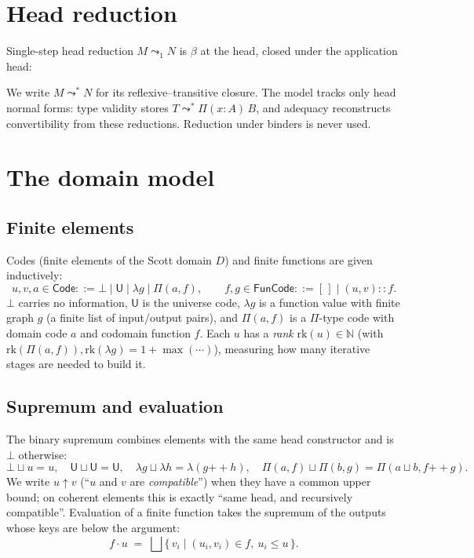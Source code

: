 \documentclass[11pt]{article}
\newcommand{\Pitype}[2]{\Pi(#1)\,#2}
\newcommand{\Lamterm}[2]{\lambda(#1)\,#2}
\newcommand{\App}[2]{#1\;#2}
\newcommand{\substone}[2]{#1[#2]}
\newcommand{\U}{\mathsf{U}}
\newcommand{\Red}{\mathrel{\leadsto^{*}}}
\newcommand{\Bot}{\bot}
\newcommand{\PiC}[2]{\Pi(#1,#2)}        %
\newcommand{\FunEl}[1]{\lambda #1}      %
\newcommand{\ev}[2]{#1\!\cdot\!#2}      %
\newcommand{\app}{\mathbin{+\!\!+}}     %
\newcommand{\comp}{\mathbin{\uparrow}}  %
\newcommand{\Code}{\mathsf{Code}}
\newcommand{\FunCode}{\mathsf{FunCode}}
\newcommand{\rk}{\mathrm{rk}}
\newcommand{\Nat}{\mathbb{N}}
\theoremstyle{plain}
\theoremstyle{definition}
\begin{document}
\section{Head reduction}

Single-step head reduction $M \leadsto_1 N$ is $\beta$ at the head, closed under
the application head:
We write $M \Red N$ for its reflexive--transitive closure.  The model tracks
only head normal forms: type validity stores $T \Red \Pitype{x{:}A}{B}$, and
adequacy reconstructs convertibility from these reductions.  Reduction under
binders is never used.

\section{The domain model}

\subsection{Finite elements}

Codes (finite elements of the Scott domain $D$) and finite functions are given
inductively:
\[
  u,v,a \in \Code ::= \Bot \mid \U \mid \FunEl g \mid \PiC{a}{f},
  \qquad
  f,g \in \FunCode ::= [\,] \mid (u,v) :: f.
\]
$\Bot$ carries no information, $\U$ is the universe code, $\FunEl g$ is a
function value with finite graph $g$ (a finite list of input/output pairs),
and $\PiC{a}{f}$ is a $\Pi$-type code with domain code $a$ and codomain
function $f$.  Each $u$ has a \emph{rank} $\rk(u)\in\Nat$
(with $\rk(\PiC{a}{f}),\rk(\FunEl g) = 1+\max(\cdots)$), measuring how many
iterative stages are needed to build it.

\subsection{Supremum and evaluation}

The binary supremum combines elements with the same head constructor and is
$\Bot$ otherwise:
\[
  \Bot \sqcup u = u,\quad \U\sqcup\U = \U,\quad
  \FunEl g \sqcup \FunEl h = \FunEl{(g\app h)},\quad
  \PiC{a}{f}\sqcup\PiC{b}{g} = \PiC{a\sqcup b}{f\app g}.
\]
We write $u \comp v$ (``$u$ and $v$ are \emph{compatible}'') when they have a
common upper bound; on coherent elements this is exactly ``same head, and
recursively compatible''.  Evaluation of a finite function takes the supremum
of the outputs whose keys are below the argument:
\[
  \ev f u \;=\; \bigsqcup\{\, v_i \mid (u_i,v_i)\in f,\ u_i \leq u \,\}.
\]
\end{document}
